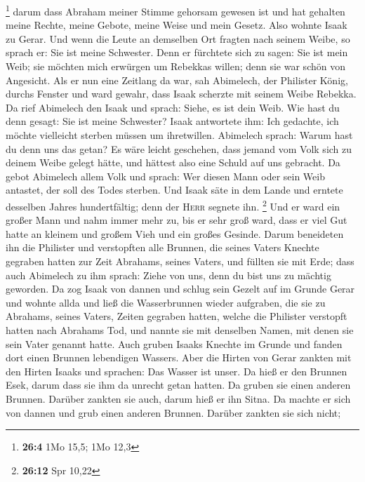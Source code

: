 \footnote{\textbf{26:4} 1Mo 15,5; 1Mo 12,3}  darum dass
Abraham meiner Stimme gehorsam gewesen ist und hat gehalten meine
Rechte, meine Gebote, meine Weise und mein Gesetz.  Also
wohnte Isaak zu Gerar.  Und wenn die Leute an demselben
Ort fragten nach seinem Weibe, so sprach er: Sie ist meine Schwester.
Denn er fürchtete sich zu sagen: Sie ist mein Weib; sie möchten mich
erwürgen um Rebekkas willen; denn sie war schön von Angesicht.
 Als er nun eine Zeitlang da war, sah Abimelech, der
Philister König, durchs Fenster und ward gewahr, dass Isaak scherzte mit
seinem Weibe Rebekka.  Da rief Abimelech den Isaak und
sprach: Siehe, es ist dein Weib. Wie hast du denn gesagt: Sie ist meine
Schwester? Isaak antwortete ihm: Ich gedachte, ich möchte vielleicht
sterben müssen um ihretwillen.  Abimelech sprach: Warum
hast du denn uns das getan? Es wäre leicht geschehen, dass jemand vom
Volk sich zu deinem Weibe gelegt hätte, und hättest also eine Schuld auf
uns gebracht.  Da gebot Abimelech allem Volk und sprach:
Wer diesen Mann oder sein Weib antastet, der soll des Todes sterben.
 Und Isaak säte in dem Lande und erntete desselben Jahres
hundertfältig; denn der \textsc{Herr} segnete ihn. \footnote{\textbf{26:12}
  Spr 10,22}  Und er ward ein großer Mann und nahm immer
mehr zu, bis er sehr groß ward,  dass er viel Gut hatte
an kleinem und großem Vieh und ein großes Gesinde. Darum beneideten ihn
die Philister  und verstopften alle Brunnen, die seines
Vaters Knechte gegraben hatten zur Zeit Abrahams, seines Vaters, und
füllten sie mit Erde;  dass auch Abimelech zu ihm sprach:
Ziehe von uns, denn du bist uns zu mächtig geworden.  Da
zog Isaak von dannen und schlug sein Gezelt auf im Grunde Gerar und
wohnte allda  und ließ die Wasserbrunnen wieder
aufgraben, die sie zu Abrahams, seines Vaters, Zeiten gegraben hatten,
welche die Philister verstopft hatten nach Abrahams Tod, und nannte sie
mit denselben Namen, mit denen sie sein Vater genannt hatte.
 Auch gruben Isaaks Knechte im Grunde und fanden dort
einen Brunnen lebendigen Wassers.  Aber die Hirten von
Gerar zankten mit den Hirten Isaaks und sprachen: Das Wasser ist unser.
Da hieß er den Brunnen Esek, darum dass sie ihm da unrecht getan hatten.
 Da gruben sie einen anderen Brunnen. Darüber zankten sie
auch, darum hieß er ihn Sitna.  Da machte er sich von
dannen und grub einen anderen Brunnen. Darüber zankten sie sich nicht;
